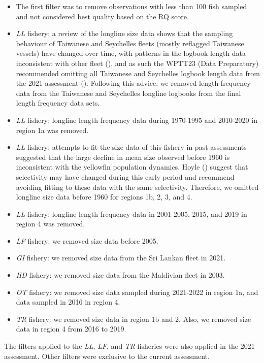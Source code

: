 \documentclass[
]{scrartcl}
\begin{document}
\begin{itemize}
\item
  The first filter was to remove observations with less than 100 fish
  sampled and not considered best quality based on the RQ score.
\item
  \emph{LL} fishery: a review of the longline size data shows that the
  sampling behaviour of Taiwanese and Seychelles fleets (mostly
  reflagged Taiwanese vessels) have changed over time, with patterns in
  the logbook length data inconsistent with other fleet
  (), and as such the
  WPTT23 (Data Preparatory) recommended omitting all Taiwanese and
  Seychelles logbook length data from the 2021 assessment
  (). Following
  this advice, we removed length frequency data from the Taiwanese and
  Seychelles longline logbooks from the final length frequency data
  sets.
\item
  \emph{LL} fishery: longline length frequency data during 1970-1995 and
  2010-2020 in region 1a was removed.
\item
  \emph{LL} fishery: attempts to fit the size data of this fishery in
  past assessments suggested that the large decline in mean size
  observed before 1960 is inconsistent with the yellowfin population
  dynamics. Hoyle () suggest
  that selectivity may have changed during this early period and
  recommend avoiding fitting to these data with the same selectivity.
  Therefore, we omitted longline size data before 1960 for regions 1b,
  2, 3, and 4.
\item
  \emph{LL} fishery: longline length frequency data in 2001-2005, 2015,
  and 2019 in region 4 was removed.
\item
  \emph{LF} fishery: we removed size data before 2005.
\item
  \emph{GI} fishery: we removed size data from the Sri Lankan fleet in
  2021.
\item
  \emph{HD} fishery: we removed size data from the Maldivian fleet in
  2003.
\item
  \emph{OT} fishery: we removed size data sampled during 2021-2022 in
  region 1a, and data sampled in 2016 in region 4.
\item
  \emph{TR} fishery: we removed size data in region 1b and 2. Also, we
  removed size data in region 4 from 2016 to 2019.
\end{itemize}

The filters applied to the \emph{LL}, \emph{LF}, and \emph{TR} fisheries
were also applied in the 2021 assessment. Other filters were exclusive
to the current assessment.
\end{document}
